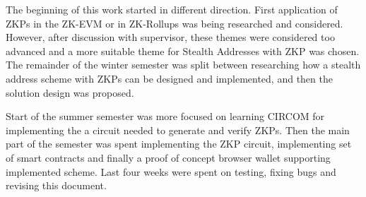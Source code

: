 The beginning of this work started in different direction. First application of
ZKPs in the ZK-EVM or in ZK-Rollups was being researched and considered. However,
after discussion with supervisor, these themes were considered too advanced and
a more suitable theme for Stealth Addresses with ZKP was chosen. The remainder
of the winter semester was split between researching how a stealth address scheme
with ZKPs can be designed and implemented, and then the solution design was proposed.

Start of the summer semester was more focused on learning CIRCOM for implementing
the a circuit needed to generate and verify ZKPs. Then the main part of the semester
was spent implementing the ZKP circuit, implementing set of smart contracts
and finally a proof of concept browser wallet supporting implemented scheme.
Last four weeks were spent on testing, fixing bugs and revising this document.

